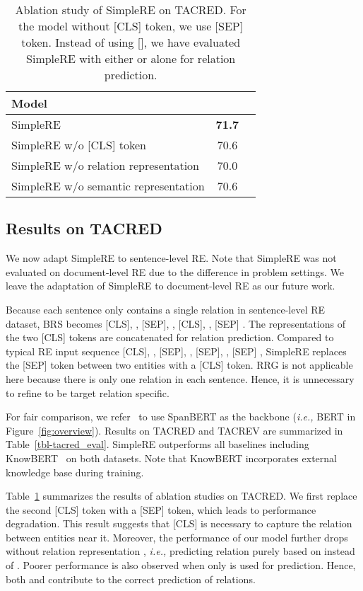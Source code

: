 \documentclass{article}
\newcommand{\ie}{\emph{i.e.,}\xspace}
\begin{document}
\begin{table}[t]
\small
\centering
\caption{Ablation study of SimpleRE on TACRED. For the model without  [CLS] token, we use [SEP] token. Instead of using [], we have evaluated SimpleRE with either  or  alone for relation prediction.}
\begin{tabular}{l|c c}
\toprule
Model                 &               \\ 
\midrule
SimpleRE                & \textbf{71.7}  \\
SimpleRE w/o  [CLS] token     & 70.6     \\
SimpleRE w/o relation representation               & 70.0      \\
SimpleRE w/o semantic representation               & 70.6      \\
\bottomrule
\end{tabular}
\label{tbl-tacred_a_study}
\end{table}

\subsection{Results on TACRED}
We now adapt SimpleRE to sentence-level RE. Note that SimpleRE was not evaluated on document-level RE due to the difference in problem settings. We leave the adaptation of SimpleRE to document-level RE as our future work. 

Because each sentence only contains a single relation in  sentence-level RE dataset, BRS becomes [CLS], , [SEP], , [CLS], , [SEP] . The representations of the two [CLS] tokens are concatenated for relation prediction. Compared to typical RE input sequence [CLS], , [SEP], , [SEP], , [SEP] , SimpleRE replaces the [SEP] token between two entities with a [CLS] token. RRG is not applicable here because there is only one relation in each sentence. Hence, it is unnecessary to refine  to be target relation specific. 

For fair comparison, we refer~\cite{xue2020gdpnet} to use SpanBERT as the backbone (\ie BERT in Figure~\ref{fig:overview}). Results on TACRED and TACREV are summarized in Table~\ref{tbl-tacred_eval}. SimpleRE outperforms all baselines including KnowBERT~\cite{Peters2019KnowledgeEC} on both datasets. Note that KnowBERT incorporates external knowledge base during training. 

Table~\ref{tbl-tacred_a_study} summarizes the results of ablation studies on TACRED. We first replace the second [CLS] token with a [SEP] token, which leads to  performance degradation. This result suggests that [CLS] is necessary to capture the relation between entities near it. Moreover, the performance of our model further drops without relation representation , \ie predicting relation purely based on  instead of . Poorer performance is also observed when only  is used for prediction. Hence, both  and  contribute to the correct prediction of relations. 
\end{document}
